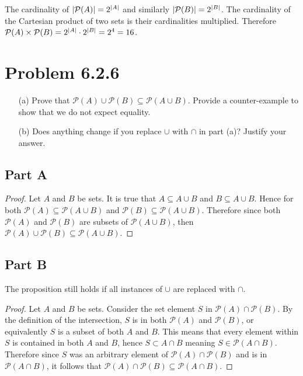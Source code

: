 \documentclass[12pt]{extarticle}
\newcommand{\powerset}[1]{\mathcal{P}(#1)}
\begin{document}
The cardinality of $\qty|\powerset{A}| = 2^\qty|A|$ and similarly $\qty|\powerset{B}| = 2^\qty|B|$. The cardinality of the Cartesian product of two sets is their cardinalities multiplied. Therefore $\powerset{A} \times \powerset{B} = 2^\qty|A| \cdot 2^\qty|B| = 2^4 = 16$.

\section*{Problem 6.2.6}

\begin{enumerate}
	\item[(a)] Prove that $\powerset{A} \cup \powerset{B} \subseteq \powerset{A \cup B}$. Provide a counter-example to show that we do not expect equality.
	\item[(b)] Does anything change if you replace $\cup$ with $\cap$ in part (a)? Justify your answer.
\end{enumerate}

\subsection*{Part A}

\begin{proof}
	Let $A$ and $B$ be sets. It is true that $A \subseteq A \cup B$ and $B \subseteq A \cup B$. Hence for both $\powerset{A} \subseteq \powerset{A \cup B}$ and $\powerset{B} \subseteq \powerset{A \cup B}$. Therefore since both $\powerset{A}$ and $\powerset{B}$ are subsets of $\powerset{A \cup B}$, then $\powerset{A} \cup \powerset{B} \subseteq \powerset{A \cup B}$.
\end{proof}

\subsection*{Part B}

The proposition still holds if all instances of $\cup$ are replaced with $\cap$.

\begin{proof}
	Let $A$ and $B$ be sets. Consider the set element $S$ in $\powerset{A} \cap \powerset{B}$. By the definition of the intersection, $S$ is in both $\powerset{A}$ and $\powerset{B}$, or equivalently $S$ is a subset of both $A$ and $B$. This means that every element within $S$ is contained in both $A$ and $B$, hence $S \subset A \cap B$ meaning $S \in \powerset{A \cap B}$. Therefore since $S$ was an arbitrary element of $\powerset{A} \cap \powerset{B}$ and is in $\powerset{A \cap B}$, it follows that $\powerset{A} \cap \powerset{B} \subseteq \powerset{A \cap B}$.
\end{proof}
\end{document}
